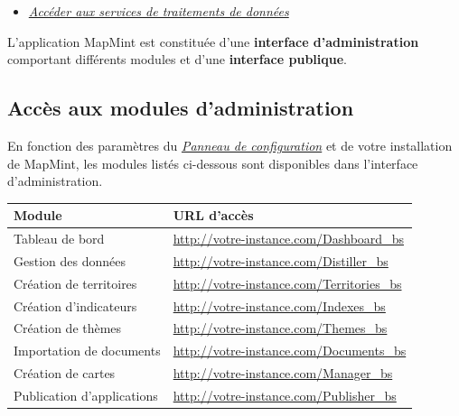 \documentclass[letterpaper,10pt,french]{sphinxmanual}
\begin{document}
{\begin{minipage}{0.95\linewidth}
\begin{itemize}
\begin{itemize}
\begin{itemize}
\item {} 
\label{introduction/usemapmint:id11}{\hyperref[introduction/usemapmint:acceder-aux-services-de-traitements-de-donnees]{\emph{Accéder aux services de traitements de données}}}

\end{itemize}

\end{itemize}

\end{itemize}
\end{minipage}}
\begin{center}\setlength{\fboxsep}{5pt}\end{center}

L'application MapMint est constituée d'une \textbf{interface
d'administration} comportant différents modules et d'une \textbf{interface
publique}.


\subsection{Accès aux modules d'administration}
\label{introduction/usemapmint:acces-aux-modules-d-administration}\label{introduction/usemapmint:introduction-usemapmint-administration-access}
En fonction des paramètres du {\hyperref[dashboard/configuration::doc]{\emph{\emph{Panneau de configuration}}}} et de
votre installation de MapMint, les modules listés ci-dessous sont
disponibles dans l'interface d'administration.

\begin{tabulary}{\linewidth}{|L|L|}
\hline

\textbf{Module}
 & 
\textbf{URL d'accès}
\\
\hline
Tableau de bord
 & 
\href{http://votre-instance.com/Dashboard\_bs}{http://votre-instance.com/Dashboard\_bs}
\\
\hline
Gestion des données
 & 
\href{http://votre-instance.com/Distiller\_bs}{http://votre-instance.com/Distiller\_bs}
\\
\hline
Création de territoires
 & 
\href{http://votre-instance.com/Territories\_bs}{http://votre-instance.com/Territories\_bs}
\\
\hline
Création d'indicateurs
 & 
\href{http://votre-instance.com/Indexes\_bs}{http://votre-instance.com/Indexes\_bs}
\\
\hline
Création de thèmes
 & 
\href{http://votre-instance.com/Themes\_bs}{http://votre-instance.com/Themes\_bs}
\\
\hline
Importation de documents
 & 
\href{http://votre-instance.com/Documents\_bs}{http://votre-instance.com/Documents\_bs}
\\
\hline
Création de cartes
 & 
\href{http://votre-instance.com/Manager\_bs}{http://votre-instance.com/Manager\_bs}
\\
\hline
Publication d'applications
 & 
\href{http://votre-instance.com/Publisher\_bs}{http://votre-instance.com/Publisher\_bs}
\\
\hline\end{tabulary}
\end{document}
